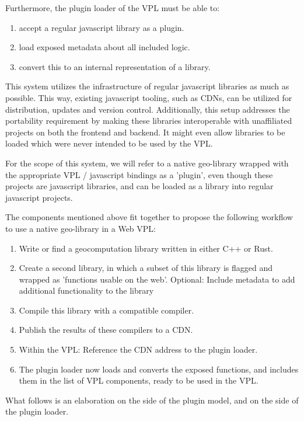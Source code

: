 Furthermore, the plugin loader of the VPL must be able to: 
\begin{enumerate}[-]
  \item accept a regular javascript library as a plugin. 
  \item load exposed metadata about all included logic.
  \item convert this to an internal representation of a library.
\end{enumerate}

This system utilizes the infrastructure of regular javascript libraries as much as possible. 
This way, existing javascript tooling, such as \ac{CDN}s, can be utilized for distribution, updates and version control.
Additionally, this setup addresses the portability requirement by making these libraries interoperable with unaffiliated projects on both the frontend and backend.
It might even allow libraries to be loaded which were never intended to be used by the VPL.

For the scope of this system, we will refer to a native geo-library wrapped with the appropriate VPL / javascript bindings as a 'plugin', even though these projects are javascript libraries, and can be loaded as a library into regular javascript projects. 

The components mentioned above fit together to propose the following workflow to use a native geo-library in a Web VPL: 
\begin{enumerate}
  \item Write or find a geocomputation library written in either C++ or Rust. 
  \item Create a second library, in which a subset of this 
     library is flagged and wrapped as 'functions usable on the web'.
  \subitem Optional: Include metadata to add additional functionality to the library
  \item Compile this library with a compatible compiler.
  \item Publish the results of these compilers to a \ac{CDN}. 
  
  \item Within the VPL: Reference the CDN address to the plugin loader. 
  \item The plugin loader now loads and converts the exposed functions, and includes them in the list of VPL components, ready to be used in the VPL. 
\end{enumerate}
What follows is an elaboration on the side of the plugin model, and on the side of the plugin loader.

